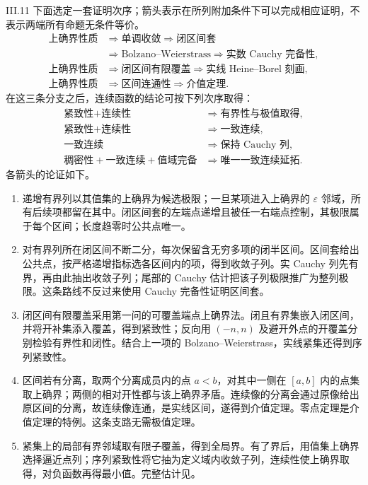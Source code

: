 \begin{solution}{III.11}
下面选定一套证明次序；箭头表示在所列附加条件下可以完成相应证明，不表示两端所有命题无条件等价。
\[
\begin{aligned}
 \text{上确界性质}&\Longrightarrow\text{单调收敛}
 \Longrightarrow\text{闭区间套}\\
 &\Longrightarrow\text{Bolzano--Weierstrass}
 \Longrightarrow\text{实数 Cauchy 完备性},\\
 \text{上确界性质}&\Longrightarrow\text{闭区间有限覆盖}
 \Longrightarrow\text{实线 Heine--Borel 刻画},\\
 \text{上确界性质}&\Longrightarrow\text{区间连通性}
 \Longrightarrow\text{介值定理}.
\end{aligned}
\]
在这三条分支之后，连续函数的结论可按下列次序取得：
\[
\begin{aligned}
 \text{紧致性}+\text{连续性}&\Longrightarrow\text{有界性与极值取得},\\
 \text{紧致性}+\text{连续性}&\Longrightarrow\text{一致连续},\\
 \text{一致连续}&\Longrightarrow\text{保持 Cauchy 列},\\
 \text{稠密性}+\text{一致连续}+\text{值域完备}
 &\Longrightarrow\text{唯一一致连续延拓}.
\end{aligned}
\]
各箭头的论证如下。
\begin{enumerate}
 \item 递增有界列以其值集的上确界为候选极限；一旦某项进入上确界的 \(\varepsilon\) 邻域，所有后续项都留在其中。闭区间套的左端点递增且被任一右端点控制，其极限属于每个区间；长度趋零时公共点唯一。
 \item 对有界列所在闭区间不断二分，每次保留含无穷多项的闭半区间。区间套给出公共点，按严格递增指标选各区间内的项，得到收敛子列。实 Cauchy 列先有界，再由此抽出收敛子列；尾部的 Cauchy 估计把该子列极限推广为整列极限。这条路线不反过来使用 Cauchy 完备性证明区间套。
 \item 闭区间有限覆盖采用第一问的可覆盖端点上确界法。闭且有界集嵌入闭区间，并将开补集添入覆盖，得到紧致性；反向用 \((-n,n)\) 及避开外点的开覆盖分别检验有界性和闭性。结合上一项的 Bolzano--Weierstrass，实线紧集还得到序列紧致性。
 \item 区间若有分离，取两个分离成员内的点 \(a<b\)，对其中一侧在 \([a,b]\) 内的点集取上确界；两侧的相对开性都与该上确界矛盾。连续像的分离会通过原像给出原区间的分离，故连续像连通，是实线区间，遂得到介值定理。零点定理是介值定理的特例。这条支路无需极值定理。
 \item 紧集上的局部有界邻域取有限子覆盖，得到全局界。有了界后，用值集上确界选择逼近点列；序列紧致性将它抽为定义域内收敛子列，连续性使上确界取得，对负函数再得最小值。完整估计见。

\end{enumerate}
\end{solution}
